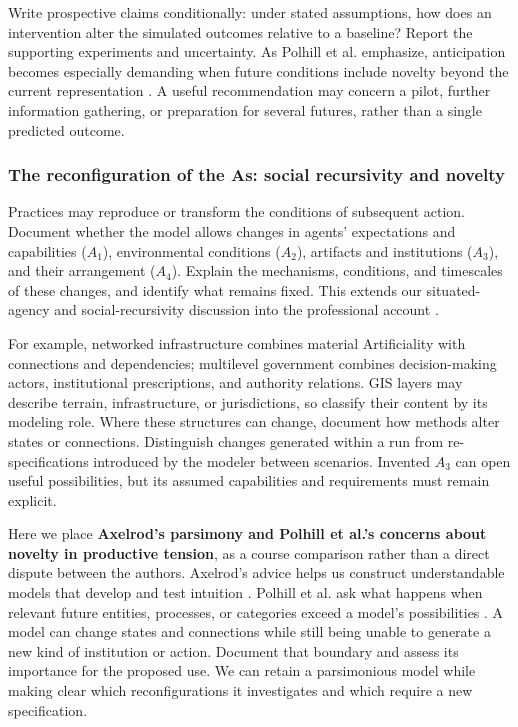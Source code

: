 \documentclass[11pt,a4paper]{article}
\begin{document}
Write prospective claims conditionally: under stated assumptions, how does an intervention alter the simulated outcomes relative to a baseline? Report the supporting experiments and uncertainty. As Polhill et al. emphasize, anticipation becomes especially demanding when future conditions include novelty beyond the current representation \cite{polhill_prediction_2021}. A useful recommendation may concern a pilot, further information gathering, or preparation for several futures, rather than a single predicted outcome.

\subsubsection{The reconfiguration of the As: social recursivity and novelty}

Practices may reproduce or transform the conditions of subsequent action. Document whether the model allows changes in agents' expectations and capabilities ($A_1$), environmental conditions ($A_2$), artifacts and institutions ($A_3$), and their arrangement ($A_4$). Explain the mechanisms, conditions, and timescales of these changes, and identify what remains fixed. This extends our situated-agency and social-recursivity discussion into the professional account \cite{knoeri}.

For example, networked infrastructure combines material Artificiality with connections and dependencies; multilevel government combines decision-making actors, institutional prescriptions, and authority relations. GIS layers may describe terrain, infrastructure, or jurisdictions, so classify their content by its modeling role. Where these structures can change, document how methods alter states or connections. Distinguish changes generated within a run from re-specifications introduced by the modeler between scenarios. Invented $A_3$ can open useful possibilities, but its assumed capabilities and requirements must remain explicit.

Here we place \textbf{Axelrod's parsimony and Polhill et al.'s concerns about novelty in productive tension}, as a course comparison rather than a direct dispute between the authors. Axelrod's advice helps us construct understandable models that develop and test intuition \cite{axelrod_complexity_1997}. Polhill et al. ask what happens when relevant future entities, processes, or categories exceed a model's possibilities \cite{polhill_prediction_2021}. A model can change states and connections while still being unable to generate a new kind of institution or action. Document that boundary and assess its importance for the proposed use. We can retain a parsimonious model while making clear which reconfigurations it investigates and which require a new specification.
\end{document}

